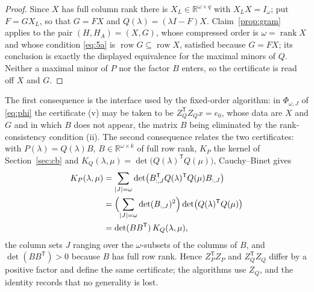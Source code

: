 \documentclass[journal]{IEEEtran}
\theoremstyle{plainn}
\theoremstyle{remark}
\begin{document}
\begin{proof}
Since $X$ has full column rank there is $X_L\in\mathbb R^{\omega\times q}$ with $X_LX=I_\omega$; put
$F=GX_L$, so that $G=FX$ and $Q(\lambda)=(\lambda I-F)X$. Claim~\ref{prop:gram} applies to the pair
$(H,H_A)=(X,G)$, whose compressed order is $\omega=\operatorname{rank}X$ and whose condition
\eqref{eq:5a} is $\operatorname{row}G\subseteq\operatorname{row}X$, satisfied because $G=FX$; its
conclusion is exactly the displayed equivalence for the maximal minors of $Q$. Neither a maximal minor
of $P$ nor the factor $B$ enters, so the certificate is read off $X$ and $G$.
\end{proof}

The first consequence is the interface used by the fixed-order algorithm: in $\Phi_{\omega,J}$ of
\eqref{eq:phi} the certificate (v) may be taken to be $Z_Q^{\mathsf T}Z_Qx=e_0$, whose data are $X$ and
$G$ and in which $B$ does not appear, the matrix $B$ being eliminated by the rank-consistency condition
(ii). The second consequence relates the two certificates: with $P(\lambda)=Q(\lambda)B$,
$B\in\mathbb R^{\omega\times k}$ of full row rank, $K_P$ the kernel of Section~\ref{sec:cb} and
$K_Q(\lambda,\mu)=\det\bigl(Q(\lambda)^{\mathsf T}Q(\mu)\bigr)$, Cauchy--Binet gives
\begin{align*}
K_P(\lambda,\mu)
&=\sum_{|J|=\omega}\det\bigl(B_{:,J}^{\mathsf T}Q(\lambda)^{\mathsf T}Q(\mu)B_{:,J}\bigr)\\
&=\Bigl(\sum_{|J|=\omega}\det(B_{:,J})^2\Bigr)\det\bigl(Q(\lambda)^{\mathsf T}Q(\mu)\bigr)\\
&=\det(BB^{\mathsf T})\,K_Q(\lambda,\mu),
\end{align*}
the column sets $J$ ranging over the $\omega$-subsets of the columns of $B$, and
$\det(BB^{\mathsf T})>0$ because $B$ has full row rank. Hence $Z_P^{\mathsf T}Z_P$ and
$Z_Q^{\mathsf T}Z_Q$ differ by a positive factor and define the same certificate; the algorithms use
$Z_Q$, and the identity records that no generality is lost.
\end{document}
